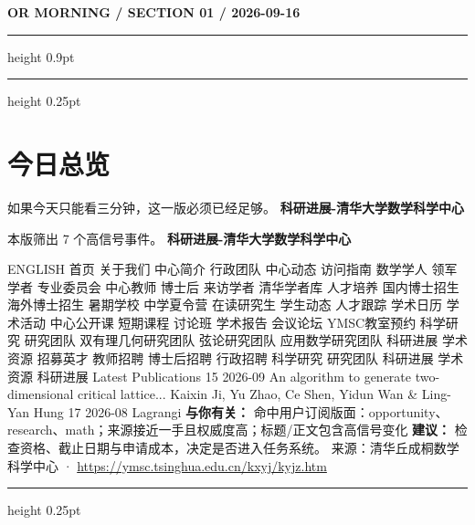 \documentclass[10.5pt]{ctexart}
\begin{document}
{\small\bfseries OR MORNING / SECTION 01 / 2026-09-16}
\vspace{2mm}
\hrule height 0.9pt
\vspace{1.5mm}
\hrule height 0.25pt
\vspace{4mm}
\section*{今日总览}
{\color{ormuted} 如果今天只能看三分钟，这一版必须已经足够。}
\vspace{2mm}
{\fontsize{25}{29}\selectfont\bfseries 科研进展-清华大学数学科学中心}\par
\vspace{2mm}
{\large 本版筛出 7 个高信号事件。}
\vspace{3mm}
{\Large\bfseries 科研进展-清华大学数学科学中心}\par
ENGLISH 首页 关于我们 中心简介 行政团队 中心动态 访问指南 数学学人 领军学者 专业委员会 中心教师 博士后 来访学者 清华学者库 人才培养 国内博士招生 海外博士招生 暑期学校 中学夏令营 在读研究生 学生动态 人才跟踪 学术日历 学术活动 中心公开课 短期课程 讨论班 学术报告 会议论坛 YMSC教室预约 科学研究 研究团队 双有理几何研究团队 弦论研究团队 应用数学研究团队 科研进展 学术资源 招募英才 教师招聘 博士后招聘 行政招聘 科学研究 研究团队 科研进展 学术资源 科研进展 Latest Publications 15 2026-09 An algorithm to generate two-dimensional critical lattice... Kaixin Ji, Yu Zhao, Ce Shen, Yidun Wan \& Ling-Yan Hung 17 2026-08 Lagrangi
\textbf{与你有关：} 命中用户订阅版面：opportunity、research、math；来源接近一手且权威度高；标题/正文包含高信号变化
\textbf{建议：} 检查资格、截止日期与申请成本，决定是否进入任务系统。
{\footnotesize\color{ormuted} 来源：清华丘成桐数学科学中心 · \url{https://ymsc.tsinghua.edu.cn/kxyj/kyjz.htm}}
\vspace{3mm}
\hrule height 0.25pt
\vspace{3mm}
\end{document}
